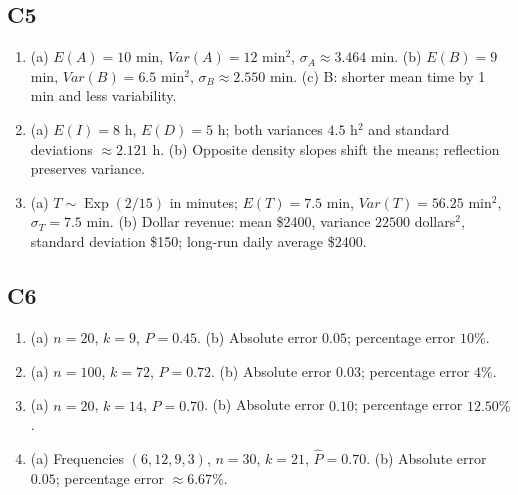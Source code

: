 {\subsection*{C5}
\begin{enumerate}[label=\textbf{C5.\arabic*.}]
\item (a) $E(A)=10$ min, $Var(A)=12$ min$^2$, $\sigma_A\approx3.464$ min.
(b) $E(B)=9$ min, $Var(B)=6.5$ min$^2$, $\sigma_B\approx2.550$ min.
(c) B: shorter mean time by 1 min and less variability.
\item (a) $E(I)=8$ h, $E(D)=5$ h; both variances $4.5$ h$^2$ and
standard deviations $\approx2.121$ h.
(b) Opposite density slopes shift the means; reflection preserves variance.
\item (a) $T\sim\operatorname{Exp}(2/15)$ in minutes;
$E(T)=7.5$ min, $Var(T)=56.25$ min$^2$, $\sigma_T=7.5$ min.
(b) Dollar revenue: mean \$2400, variance $22500$ dollars$^2$,
standard deviation \$150; long-run daily average \$2400.
\end{enumerate}
\subsection*{C6}
\begin{enumerate}[label=\textbf{C6.\arabic*.}]
\item (a) $n=20$, $k=9$, $\widehat P=0.45$.
(b) Absolute error $0.05$; percentage error $10\%$.
\item (a) $n=100$, $k=72$, $\widehat P=0.72$.
(b) Absolute error $0.03$; percentage error $4\%$.
\item (a) $n=20$, $k=14$, $\widehat P=0.70$.
(b) Absolute error $0.10$; percentage error $12.50\%$.
\item (a) Frequencies $(6,12,9,3)$, $n=30$, $k=21$, $\widehat P=0.70$.
(b) Absolute error $0.05$; percentage error $\approx6.67\%$.
\end{enumerate}
}
